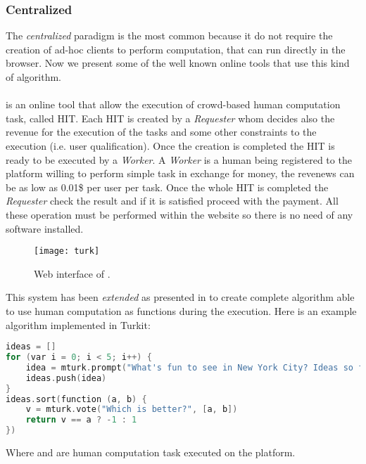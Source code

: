 \subsubsection{Centralized}
The \emph{centralized} paradigm is the most common because it do not require the
creation of ad-hoc clients to perform computation, that can run directly in the
browser. Now we present some of the well known online tools that use this kind
of algorithm.

\paragraph{} is an online tool that allow the execution of
crowd-based human computation task, called \ac{HIT}. Each \ac{HIT} is created
by a \emph{Requester} whom decides also the revenue for the execution of the
tasks and some other constraints to the execution (i.e. user qualification).
Once the creation is completed the \ac{HIT} is ready to be executed by a
\emph{Worker}. A \emph{Worker} is a human being registered to the 
platform willing to perform simple task in exchange for money, the revenews can
be as low as 0.01\$ per user per task. Once the whole \ac{HIT} is completed the
\emph{Requester} check the result and if it is satisfied proceed with the
payment. All these operation must be performed within the 
website so there is no need of any software installed.\\
\begin{figure}[htb]
    \centering
    \texttt{[image: turk]}
    \caption{Web interface of .}
    \label{fig:turk}
\end{figure}

This system has been \emph{extended} as presented in \cite{little2010turkit}
to create complete algorithm able to use human computation as functions during
the execution. Here is an example algorithm implemented in Turkit:
\begin{lstlisting}[language=C++]
ideas = []
for (var i = 0; i < 5; i++) {
	idea = mturk.prompt("What's fun to see in New York City? Ideas so far: " + ideas.join(", "))
	ideas.push(idea)
}
ideas.sort(function (a, b) {
	v = mturk.vote("Which is better?", [a, b])
	return v == a ? -1 : 1
})
\end{lstlisting}
Where  and  are human computation task
executed on the  platform.


